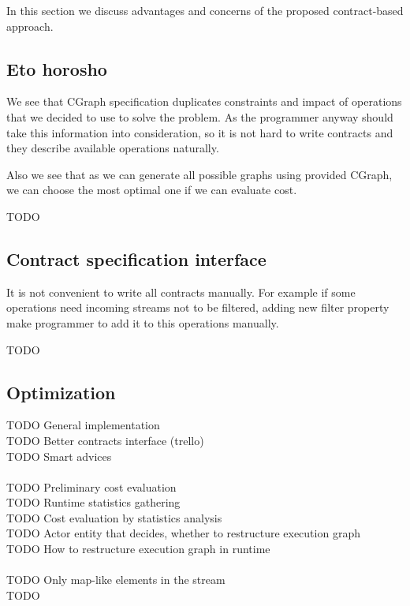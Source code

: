 In this section we discuss advantages and concerns of the proposed contract-based approach.

\subsection{Eto horosho}

We see that CGraph specification duplicates constraints and impact of operations that we decided to use to solve the problem.
As the programmer anyway should take this information into consideration, so it is not hard to write contracts and they describe available operations naturally.

Also we see that as we can generate all possible graphs using provided CGraph, we can choose the most optimal one if we can evaluate cost.

TODO

\subsection{Contract specification interface}

It is not convenient to write all contracts manually.
For example if some operations need incoming streams not to be filtered, adding new filter property make programmer to add it to this operations manually.


TODO

\subsection{Optimization}



TODO General implementation \\
TODO Better contracts interface (trello) \\
TODO Smart advices \\
 \\
TODO Preliminary cost evaluation \\
TODO Runtime statistics gathering \\
TODO Cost evaluation by statistics analysis \\
TODO Actor entity that decides, whether to restructure execution graph \\
TODO How to restructure execution graph in runtime \\
 \\
TODO Only map-like elements in the stream \\
TODO

